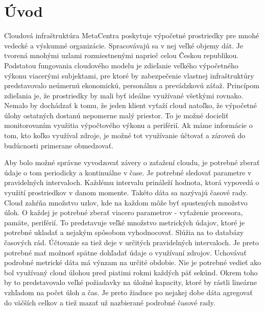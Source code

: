 \documentclass[11pt,final,oneside]{fithesis}
\begin{document}
\FrontMatter
\ThesisTitlePage

\begin{ThesisDeclaration}
\DeclarationText
\AdvisorName
\end{ThesisDeclaration}


\begin{ThesisThanks}
\end{ThesisThanks}

\begin{ThesisAbstract}
\end{ThesisAbstract}

\begin{ThesisKeyWords}
\end{ThesisKeyWords}

\tableofcontents
{}

\MainMatter
\chapter{Úvod}
Cloudová infraštruktúra MetaCentra poskytuje výpočetné prostriedky pre mnohé vedecké a výskumné organizácie. Spracovávajú sa v nej veľké objemy dát. Je tvorená mnohými uzlami rozmiestnenými naprieč celou
Českou republikou. Podstatou fungovania cloudového modelu je zdieľanie veľkého výpočetného výkonu viacerými subjektami, pre ktoré by zabezpečenie vlastnej infraštruktúry predstavovalo neúmernú 
ekonomickú, personálnu a prevádzkovú záťaž. Princípom zdieľania je, že prostriedky by mali byť ideálne využívané všetkými rovnako. Nemalo by dochádzať k tomu, že jeden klient vyťaží cloud natoľko, že 
výpočetné úlohy ostatných dostanú nepomerne malý priestor. To je možné docieliť monitorovaním využitia výpočtového výkonu a periférií. Ak máme informácie o tom, kto koľko využíval zdroje, je možné
tot využívanie účtovať a zároveň do budúcnosti primerane obmedzovať. 

Aby bolo možné správne vyvodzovať závery o zaťažení cloudu, je potrebné zberať údaje o tom periodicky a kontinuálne v čase. Je potrebné sledovať parametre v pravidelných intervaloch. Každému intervalu 
prináleží hodnota, ktorá vypovedá o využití prostriedkov v danom momente. Takéto dáta sa nazývajú časové rady. Cloud zahŕňa množstvo uzlov, kde na každom môže byť spustených množstvo úloh. O každej je
potrebné zberať viacero parametrov - vyťaženie procesora, pamäte, periférií. To predstavuje veľké množstvo metrických údajov, ktoré je potrebné ukladať a nejakým spôsobom vyhodnocovať. Slúžia na to 
databázy časových rád. Účtovanie sa tiež deje v určitých pravidelných intervaloch. Je preto potrebné mať možnosť spätne dohľadať údaje o využívaní zdrojov. Uchovávať podrobné metrické dáta má výnzam na určité
obdobie. Nie je potrebné vedieť ako bol využívaný cloud úlohou pred piatimi rokmi každých päť sekúnd. Okrem toho by to predstavovalo veľké požiadavky na úložné kapacity, ktoré by rástli lineárne vzhľadom
na počet úloh a čas. Je preto žiaduce po nejakej dobe dáta agregovať do väčších celkov a tiež mazať už nazbierané podrobné časové rady.
\end{document}
